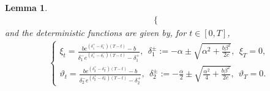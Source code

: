 \documentclass[11pt]{article}
\newtheorem{lemma}{Lemma}[section]
\numberwithin{equation}{section}
\begin{document}
\begin{lemma}
\begin{align}
\begin{cases}
\end{cases}
\end{align}
and the deterministic functions are given by, for $t\in[0,T]$,
\begin{align}\label{xi}
\begin{cases}
\displaystyle \xi_t=\frac{be^{(\delta_1^+-\delta_1^-)(T-t)}-b}{\delta_1^-e^{(\delta_1^+-\delta_1^-)(T-t)}-\delta_1^+},~~\delta_1^{\pm}:=-\alpha\pm\sqrt{\alpha^2+\frac{b\beta^2}{2c}},~~\xi_T=0,\\[0.6em] \displaystyle \vartheta_t=\frac{be^{(\delta_2^+-\delta_2^-)(T-t)}-b}{\delta_2^-e^{(\delta_2^+-\delta_2^-)(T-t)}-\delta_2^+},~ ~\delta_2^{\pm}:=-\frac{\alpha}{2}\pm\sqrt{\frac{\alpha^2}{4}+\frac{b\beta^2}{2c}},~~\vartheta_T=0.
\end{cases}
\end{align}
\end{lemma}
\end{document}
